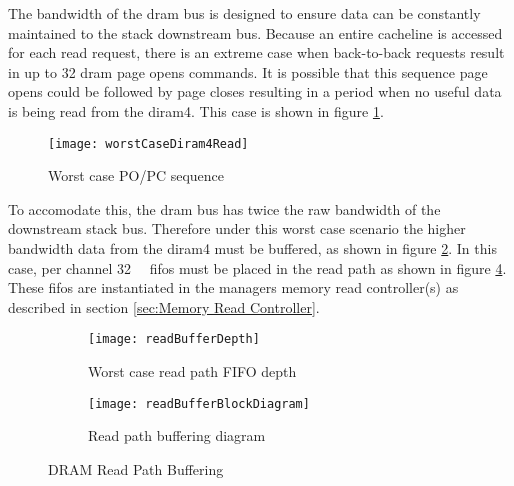 The bandwidth of the \ac{dram} bus is designed to ensure data can be constantly maintained to the stack downstream bus.
Because an entire cacheline is accessed for each read request, there is an extreme case when back-to-back requests result in up to 32 \ac{dram} page opens commands.
It is possible that this sequence page opens could be followed by page closes resulting in a period when no useful data is being read from the \ac{diram4}.
This case is shown in figure \ref{fig:Worst case PO/PC sequence}.
\begin{figure}[!t]
\centering
\captionsetup{justification=centering}
\captionsetup{width=.9\linewidth}
\centerline{
\mbox{\texttt{[image: worstCaseDiram4Read]}}
}
\caption{Worst case PO/PC sequence}
\label{fig:Worst case PO/PC sequence}
\end{figure}
To accomodate this, the \ac{dram} bus has twice the raw bandwidth of the downstream stack bus. 
Therefore under this worst case scenario the higher bandwidth data from the \ac{diram4} must be buffered, as shown in figure \ref{fig:Worst case read path FIFO depth}.
In this case, per channel \SI[per-mode=symbol]{32}{\kilo\bit} \acp{fifo} must be placed in the read path as shown in figure \ref{fig:DRAM Read Path Buffering}.
These \acp{fifo} are instantiated in the managers memory read controller(s) as described in section \ref{sec:Memory Read Controller}.


\begin{figure}
\centering
\begin{subfigure}{.9\textwidth}
  \centering
  \texttt{[image: readBufferDepth]}
  \captionsetup{justification=centering, skip=0pt}
  \caption{Worst case read path FIFO depth}
  \label{fig:Worst case read path FIFO depth}
\end{subfigure}%

\bigskip

\vspace{-10pt}
\begin{subfigure}{.9\textwidth}
  \centering
  \texttt{[image: readBufferBlockDiagram]}
  \captionsetup{justification=centering, skip=6pt}
  \caption{Read path buffering diagram}
  \label{fig:Read path buffering diagram}
\end{subfigure}
\captionsetup{justification=centering, skip=16pt}
\caption{DRAM Read Path Buffering}
\label{fig:DRAM Read Path Buffering}
\end{figure}

\iffalse 
Each of the \ac{diram4} memories contain two channels with each channel containing 32 banks and each bank contains 4096 \SI[per-mode=symbol]{4}{\kilo\bit} pages.
\fi

